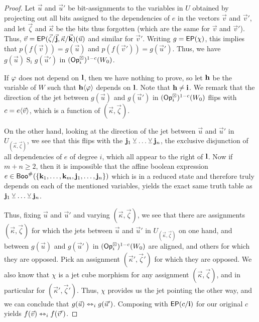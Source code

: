 \documentclass[a4paper]{memoir}
\begin{document}
\begin{proof}
	Let $\vec u$ and $\vec u'$ be bit-assignments to the variables in $U$ obtained by projecting out all bits assigned to the dependencies of $e$ in the vectors $\vec v$ and $\vec v'$, and let $\vec \zeta$ and $\vec \kappa$ be the bits thus forgotten (which are the same for $\vec v$ and $\vec v'$).
	Thus, $\vec v = \mathsf{EP}(\vec \zeta/\vec{\mathbf{j}}, \vec \kappa/\vec{\mathbf{k}})(\vec u)$ and similar for $\vec v'$.
	Writing $g = \mathsf{EP}(\chi)$, this implies that $p(f(\vec v)) = g(\vec u)$ and $p(f(\vec v')) = g(\vec u')$.
	Thus, we have $g(\vec u) \mathrel S_i g(\vec u')$ in $({\mathsf{Op}}^\boxdot_i)^{1-c}(W_0)$.
	
	If $\varphi$ does not depend on $\mathbf{l}$, then we have nothing to prove,
	so let $\mathbf{h}$ be the variable of $W$ such that $\mathbf{h} \langle \varphi \rangle$ depends on $\mathbf{l}$. Note that $\mathbf{h} \neq \mathbf{i}$.
	We remark that the direction of the jet between $g(\vec u)$ and $g(\vec u')$ in $({\mathsf{Op}}^\boxdot_i)^{1-c}(W_0)$ flips with $c = e \langle \vec v \rangle$, which is a function of $(\vec \kappa, \vec \zeta)$.
	
	On the other hand, looking at the direction of the jet between $\vec u$ and $\vec u'$ in $U_{(\vec \kappa, \vec \zeta)}$, we see that this flips with the $\mathbf{j}_1 \veebar \ldots \veebar \mathbf{j}_n$, the exclusive disjunction of all dependencies of $e$ of degree $i$, which all appear to the right of $\mathbf{l}$.
	Now if $m+n \geq 2$, then it is impossible that the affine boolean expression $e \in \mathsf{Boo}^\#(\mathopen{}\left\{ \mathbf{k}_1, \ldots, \mathbf{k}_m, \mathbf{j}_1, \ldots, \mathbf{j}_n \right\}\mathclose{})$ which is in a reduced state and therefore truly depends on each of the mentioned variables, yields the exact same truth table as $\mathbf{j}_1 \veebar \ldots \veebar \mathbf{j}_n$.
	
	Thus, fixing $\vec u$ and $\vec u'$ and varying $(\vec \kappa, \vec \zeta)$, we see that there are assignments $(\vec \kappa, \vec \zeta)$ for which the jets between $\vec u$ and $\vec u'$ in $U_{(\vec \kappa, \vec \zeta)}$ on one hand, and between $g(\vec u)$ and $g(\vec u')$ in $({\mathsf{Op}}^\boxdot_i)^{1-c}(W_0)$ are aligned, and others for which they are opposed.
	Pick an assignment $(\vec \kappa', \vec \zeta')$ for which they are opposed.
	We also know that $\chi$ is a jet cube morphism for any assignment $(\vec \kappa, \vec \zeta)$, and in particular for $(\vec \kappa', \vec \zeta')$.
	Thus, $\chi$ provides us the jet pointing the other way, and we can conclude that $g(\vec u) \leftrightarrowtriangle_i g(\vec u')$.
	Composing with $\mathsf{EP}(c/\mathbf{i})$ for our original $c$ yields $f(\vec v) \leftrightarrowtriangle_i f(\vec v')$.
\end{proof}
\end{document}
